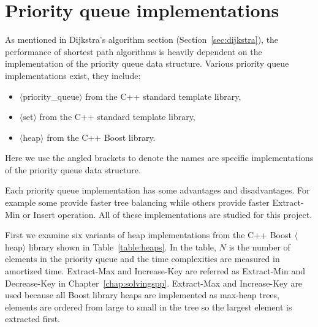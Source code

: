 \section{Priority queue implementations} \label{sec:pq_implementation}
As mentioned in Dijkstra's algorithm section (Section~\ref{sec:dijkstra}),
the performance of shortest path algorithms is heavily dependent on the implementation of the priority queue data structure.
Various priority queue implementations exist,
they include:
\begin{itemize}
    \item $\langle$priority\_queue$\rangle$ from the C++ standard template library,
    \item $\langle$set$\rangle$ from the C++ standard template library,
    \item $\langle$heap$\rangle$ from the C++ Boost library.
\end{itemize}
Here we use the angled brackets to denote the names are specific implementations of the priority queue data structure.

Each priority queue implementation has some advantages and disadvantages.
For example some provide faster tree balancing while others provide faster Extract-Min or Insert operation.
All of these implementations are studied for this project.

First we examine six variants of heap implementations from the C++ Boost $\langle$heap$\rangle$ library shown in Table~\ref{table:heaps}.
In the table, $N$ is the number of elements in the priority queue and
the time complexities are measured in amortized time.
Extract-Max and Increase-Key are referred as Extract-Min and Decrease-Key in Chapter~\ref{chap:solvingspp}.
Extract-Max and Increase-Key are used because
all Boost library heaps are implemented as max-heap trees,
elements are ordered from large to small in the tree so
the largest element is extracted first.

